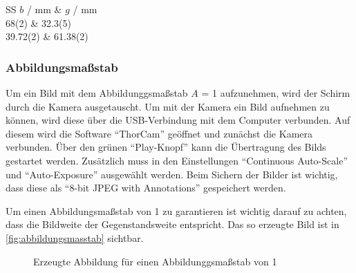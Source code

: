 \documentclass[12pt,english,ngerman]{scrartcl}
\begin{document}
\begin{table}[H]
	\centering
	\caption[Gemessene Bild und Gegenstandsweiten zur Bestimmung mithilfe des
		Besselverfahrens]{ Gemessene Bild und Gegenstandsweiten zur Bestimmung mithilfe
		des Besselverfahrens. Die Länge dazwischen beträgt dabei
		$l=\SI{116.29(2)}{\mm}$                   \\
		$b$ \dots gemessene Bildweite in \si{\mm} \\
		$g$ \dots gemessene Bildweite in \si{\mm}
	} \label{tab:werte_bessel}
	\begin{tblr}{SS}
		{{{$b$ / \si{\mm}}}} & {{{$g$ / \si{\mm}}}} \\
		68(2)                & 32.3(5)              \\
		39.72(2)             & 61.38(2)             \\
	\end{tblr}
\end{table}

\subsubsection{Abbildungsmaßstab}

Um ein Bild mit dem Abbildunggsmaßstab $A$ = 1 aufzunehmen, wird der Schirm
durch die Kamera ausgetauscht. Um mit der Kamera ein Bild aufnehmen zu können,
wird diese über die USB-Verbindung mit dem Computer verbunden. Auf diesem wird
die Software ``ThorCam'' geöffnet und zunächst die Kamera verbunden. Über den
grünen ``Play-Knopf'' kann die Übertragung des Bilds gestartet werden.
Zusätzlich muss in den Einstellungen ``Continuous Auto-Scale'' und
``Auto-Exposure'' ausgewählt werden. Beim Sichern der Bilder ist wichtig, dass
diese als ``8-bit JPEG with Annotations'' gespeichert werden.

Um einen Abbildungsmaßstab von 1 zu garantieren ist wichtig darauf zu achten,
dass die Bildweite der Gegenstandsweite entspricht. Das so erzeugte Bild ist in
\autoref{fig:abbildungsmasstab} sichtbar.

\begin{figure}[H]
	\begin{center}
	\end{center}
	\caption[Erzeugte Abbildung für einen Abbildunggsmaßstab von 1] { Erzeugte Abbildung für
		einen Abbildunggsmaßstab von 1
	}\label{fig:abbildungsmasstab}
\end{figure}
\end{document}
